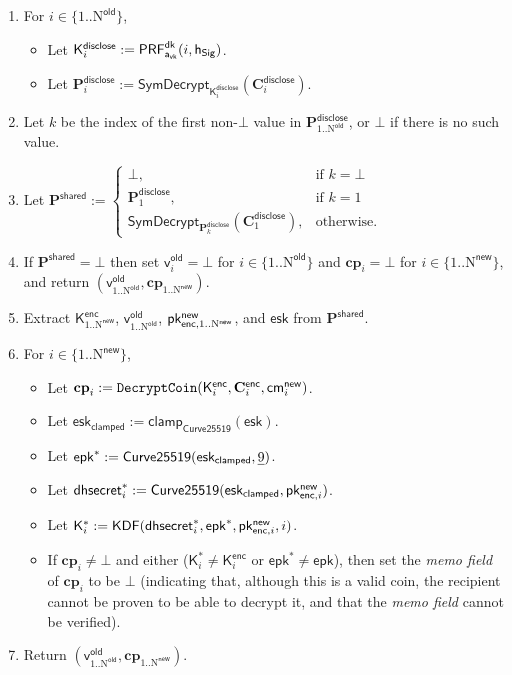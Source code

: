 \documentclass{article}
\newcommand{\term}[1]{\textsl{#1}\xspace}
\newcommand{\memo}{\term{memo field}}
\newcommand{\bytes}[1]{\underline{\raisebox{-0.22ex}{}\smash{#1}}}
\newcommand{\setof}[1]{\{{#1}\}}
\newcommand{\DiscloseKey}{\mathsf{a_{vk}}}
\newcommand{\enc}{\mathsf{enc}}
\newcommand{\disclose}{\mathsf{disclose}}
\newcommand{\shared}{\mathsf{shared}}
\newcommand{\DHSecretCompare}[1]{\mathsf{dhsecret}^*_{#1}}
\newcommand{\EphemeralPublic}{\mathsf{epk}}
\newcommand{\EphemeralPublicCompare}{\mathsf{epk}^*}
\newcommand{\EphemeralPrivate}{\mathsf{esk}}
\newcommand{\EphemeralPrivateClamped}{\mathsf{esk_{clamped}}}
\newcommand{\TransmitPublicNew}[1]{\mathsf{pk^{new}_{\enc,\mathnormal{#1}}}}
\newcommand{\CoinPlaintext}[1]{\mathbf{cp}_{#1}}
\newcommand{\CurveMultiply}{\mathsf{Curve25519}}
\newcommand{\CurveBase}{\bytes{9}}
\newcommand{\DecryptCoin}{\mathtt{DecryptCoin}}
\newcommand{\Plaintext}{\mathbf{P}}
\newcommand{\Ciphertext}{\mathbf{C}}
\newcommand{\Key}{\mathsf{K}}
\newcommand{\TransmitCiphertext}[1]{\Ciphertext^\enc_{#1}}
\newcommand{\TransmitKey}[1]{\Key^\enc_{#1}}
\newcommand{\TransmitKeyCompare}[1]{\Key^*_{#1}}
\newcommand{\DerivedKey}[1]{\Key^\disclose_{#1}}
\newcommand{\DisclosePlaintext}[1]{\Plaintext^\disclose_{#1}}
\newcommand{\DiscloseCiphertext}[1]{\Ciphertext^\disclose_{#1}}
\newcommand{\SharedPlaintext}{\Plaintext^\shared}
\newcommand{\KDF}{\mathsf{KDF}}
\newcommand{\SymDecrypt}[1]{\mathsf{SymDecrypt}_{#1}}
\newcommand{\Clamp}{\mathsf{clamp_{Curve25519}}}
\newcommand{\PRF}[2]{\mathsf{{PRF}^{#2}_\mathnormal{#1}}}
\newcommand{\PRFdk}[1]{\PRF{#1}{dk}}
\newcommand{\cmNew}[1]{\mathsf{{cm}^{new}_\mathnormal{#1}}}
\newcommand{\hSig}{\mathsf{h_{Sig}}}
\newcommand{\allN}[1]{\mathrm{1}..\mathrm{N}^\mathsf{#1}}
\newcommand{\allOld}{\allN{old}}
\newcommand{\allNew}{\allN{new}}
\newcommand{\setofOld}{\setof{\allOld}}
\newcommand{\setofNew}{\setof{\allNew}}
\newcommand{\vOld}[1]{\mathsf{v}_{#1}^\mathsf{old}}
\begin{document}
{\begin{enumerate}
  \item For $i \in \setofOld$,
    \begin{itemize}
      \item Let $\DerivedKey{i} := \PRFdk{\DiscloseKey{}}(i, \hSig)$.
      \item Let $\DisclosePlaintext{i} := \SymDecrypt{\DerivedKey{i}}(\DiscloseCiphertext{i})$.
    \end{itemize}
  \item Let $k$ be the index of the first non-$\bot$ value in $\DisclosePlaintext{\allOld}$,
        or $\bot$ if there is no such value.
  \item Let $\SharedPlaintext := \begin{cases}
          \bot,                  & \text{if $k = \bot$} \\ 
          \DisclosePlaintext{1}, & \text{if $k = 1$} \\
          \SymDecrypt{\DisclosePlaintext{k}}(\DiscloseCiphertext{1}), & \text{otherwise.}
        \end{cases}$
  \item If $\SharedPlaintext = \bot$ then
set $\vOld{i} = \bot$ for $i \in \setofOld$ and
$\CoinPlaintext{i} = \bot$ for $i \in \setofNew$, and return
$(\vOld{\allOld}, \CoinPlaintext{\allNew})$.
  \item Extract $\TransmitKey{\allNew}$, $\vOld{\allOld}$,
$\TransmitPublicNew{\allNew}$, and $\EphemeralPrivate$ from $\SharedPlaintext$.
  \item For $i \in \setofNew$,
    \begin{itemize}
      \item Let $\CoinPlaintext{i} :=
\DecryptCoin(\TransmitKey{i}, \TransmitCiphertext{i}, \cmNew{i})$.
      \item Let $\EphemeralPrivateClamped := \Clamp(\EphemeralPrivate)$.
      \item Let $\EphemeralPublicCompare := \CurveMultiply(\EphemeralPrivateClamped, \CurveBase)$.
      \item Let $\DHSecretCompare{i} := \CurveMultiply(\EphemeralPrivateClamped, \TransmitPublicNew{i})$.
      \item Let $\TransmitKeyCompare{i} := \KDF(\DHSecretCompare{i}, \EphemeralPublicCompare,
\TransmitPublicNew{i}, i)$.
      \item If $\CoinPlaintext{i} \neq \bot$ and either
($\TransmitKeyCompare{i} \neq \TransmitKey{i}$ or
$\EphemeralPublicCompare \neq \EphemeralPublic$), then set the \memo
of $\CoinPlaintext{i}$ to be $\bot$ (indicating that, although this is a valid
coin, the recipient cannot be proven to be able to decrypt it, and that the \memo
cannot be verified).
    \end{itemize}
  \item Return $(\vOld{\allOld}, \CoinPlaintext{\allNew})$.
\end{enumerate}

}
\end{document}
